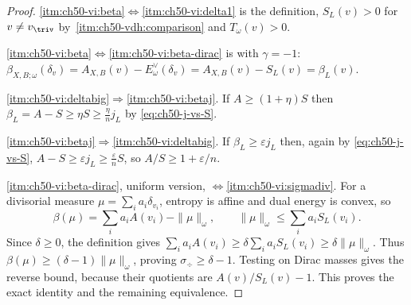 \begin{proof}
\cref{itm:ch50-vi:beta}$\Leftrightarrow$\cref{itm:ch50-vi:delta1}
is the definition, $S_L(v)>0$ for $v\ne v_{\triv}$ by
\,\cref{itm:ch50-vdh:comparison} and
$T_\omega(v)>0$.

\cref{itm:ch50-vi:beta}$\Leftrightarrow$\cref{itm:ch50-vi:beta-dirac} is
 with $\gamma=-1$:
$\beta_{X,B;\omega}(\delta_v)=A_{X,B}(v)-E^\vee_\omega(\delta_v)
=A_{X,B}(v)-S_L(v)=\beta_L(v)$.

\cref{itm:ch50-vi:deltabig}$\Rightarrow$\cref{itm:ch50-vi:betaj}.  If
$A\ge(1+\eta)S$ then $\beta_L=A-S\ge\eta S\ge\frac\eta nj_L$ by
\eqref{eq:ch50-j-vs-S}.

\cref{itm:ch50-vi:betaj}$\Rightarrow$\cref{itm:ch50-vi:deltabig}.  If
$\beta_L\ge\varepsilon j_L$ then, again by \eqref{eq:ch50-j-vs-S},
$A-S\ge\varepsilon j_L\ge\frac\varepsilon nS$, so
$A/S\ge1+\varepsilon/n$.

\cref{itm:ch50-vi:beta-dirac}, uniform version,
$\Leftrightarrow$\cref{itm:ch50-vi:sigmadiv}.  For a divisorial measure $\mu=\sum_i a_i\delta_{v_i}$, entropy is
affine and dual energy is convex, so
\[
 \beta(\mu)=\sum_i a_iA(v_i)-\|\mu\|_\omega,
 \qquad \|\mu\|_\omega\le\sum_i a_iS_L(v_i).
\]
Since $\delta\ge0$, the definition gives
$\sum_i a_iA(v_i)\ge\delta\sum_i a_iS_L(v_i)
\ge\delta\|\mu\|_\omega$.  Thus
$\beta(\mu)\ge(\delta-1)\|\mu\|_\omega$, proving
$\sigma_{\div}\ge\delta-1$.  Testing on Dirac masses gives the reverse
bound, because their quotients are $A(v)/S_L(v)-1$.
This proves the exact identity and the remaining equivalence.
\end{proof}

